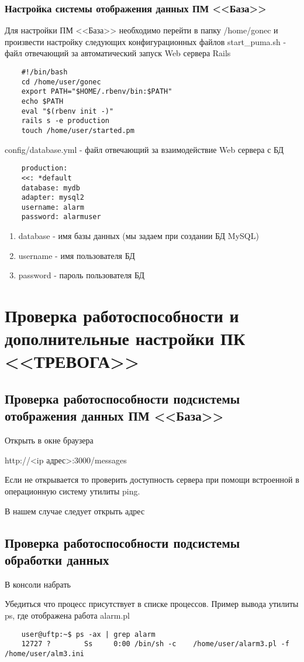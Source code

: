 ﻿\documentclass[12pt]{article}[a4paper,14pt,russian]
\begin{document}
	\subsubsection{Настройка системы отображения данных ПМ <<База>>}
	Для настройки ПМ <<База>> необходимо перейти в папку /home/gonec и произвести 
	настройку следующих конфигурационных файлов
	start\_puma.sh - файл отвечающий за автоматический запуск Web сервера Rails
	\begin{verbatim}
	#!/bin/bash
	cd /home/user/gonec
	export PATH="$HOME/.rbenv/bin:$PATH"
	echo $PATH
	eval "$(rbenv init -)"
	rails s -e production
	touch /home/user/started.pm
	\end{verbatim}

    config/database.yml - файл отвечающий за взаимодействие Web сервера с БД
\begin{verbatim}
	production:
	<<: *default
	database: mydb
	adapter: mysql2
	username: alarm
	password: alarmuser
\end{verbatim}	
 \begin{enumerate}
\item database - имя базы данных (мы задаем при создании БД  MySQL)
\item username - имя пользователя БД
\item password - пароль пользователя БД
  \end{enumerate}
	\section {Проверка работоспособности и дополнительные настройки ПК <<ТРЕВОГА>>}	
	\subsection{Проверка работоспособности подсистемы отображения данных ПМ <<База>>}
	Открыть в окне браузера 
	
	http://<ip адрес>:3000/messages
	
	Если не открывается то проверить доступность сервера при
	помощи встроенной в операционную систему утилиты ping.
	
   
   
    В нашем случае следует открыть адрес
    
    
    \subsection{Проверка работоспособности подсистемы обработки данных}
    В консоли набрать
    
    
    
    
    Убедиться что процесс присутствует в списке процессов. Пример вывода утилиты ps, где отображена работа alarm.pl
    \begin{verbatim}
    user@uftp:~$ ps -ax | grep alarm
    12727 ?        Ss     0:00 /bin/sh -c    /home/user/alarm3.pl -f /home/user/alm3.ini
    \end{verbatim}
 
\end{document}
